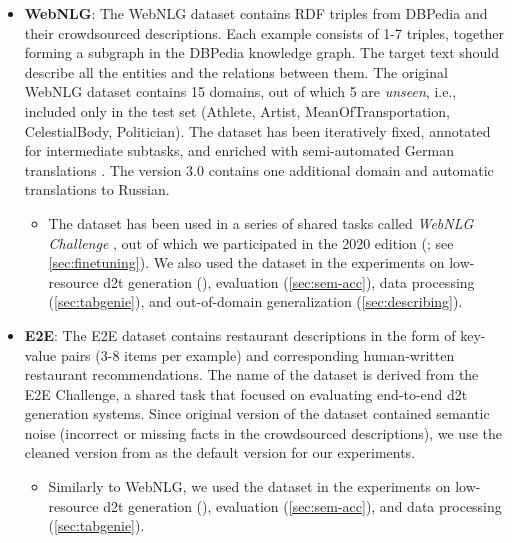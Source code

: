 \begin{itemize}
    \item \textbf{WebNLG}: The WebNLG dataset \cite{gardentCreatingTrainingCorpora2017,gardentWebNLGChallengeGenerating2017} contains RDF triples from DBPedia \cite{auer2007dbpedia} and their crowdsourced descriptions. Each example consists of 1-7 triples, together forming a subgraph in the DBPedia knowledge graph. The target text should describe all the entities and the relations between them. The original WebNLG dataset \cite{gardentCreatingTrainingCorpora2017} contains 15 domains, out of which 5 are \emph{unseen}, i.e., included only in the test set (Athlete, Artist, MeanOfTransportation, CelestialBody, Politician). The dataset has been iteratively fixed, annotated for intermediate subtasks, and enriched with semi-automated German translations \cite{castroferreiraEnrichingWebNLGCorpus2018}. The version 3.0 \cite{ferreira20202020} contains one additional domain and automatic translations to Russian.
          \begin{itemize}
              \item
                    The dataset has been used in a series of shared tasks called \emph{WebNLG Challenge} \cite{gardentWebNLGChallengeGenerating2017,shimorinaWebNLGChallengeHuman2019,ferreira20202020,cripwell2023WebNLGShared2023}, out of which we participated in the 2020 edition (\citealp{ferreira20202020}; see \autoref{sec:finetuning}). We also used the dataset in the experiments on low-resource \ac{d2t} generation (), evaluation (\autoref{sec:sem-acc}), data processing (\autoref{sec:tabgenie}), and out-of-domain generalization (\autoref{sec:describing}).
          \end{itemize}

    \item \textbf{E2E}: The E2E dataset \cite{dusekEvaluatingStateoftheartEndtoEnd2020} contains restaurant descriptions in the form of key-value pairs (3-8 items per example) and corresponding human-written restaurant recommendations. The name of the dataset is derived from the E2E Challenge, a shared task that focused on evaluating end-to-end \ac{d2t} generation systems. Since original version of the dataset contained semantic noise (incorrect or missing facts in the crowdsourced descriptions), we use the cleaned version from \citet{dusekSemanticNoiseMatters2019} as the default version for our experiments.
          \begin{itemize}
              \item
                    Similarly to WebNLG, we used the dataset in the experiments on low-resource \ac{d2t} generation (), evaluation (\autoref{sec:sem-acc}), and data processing (\autoref{sec:tabgenie}).
          \end{itemize}


\end{itemize}
